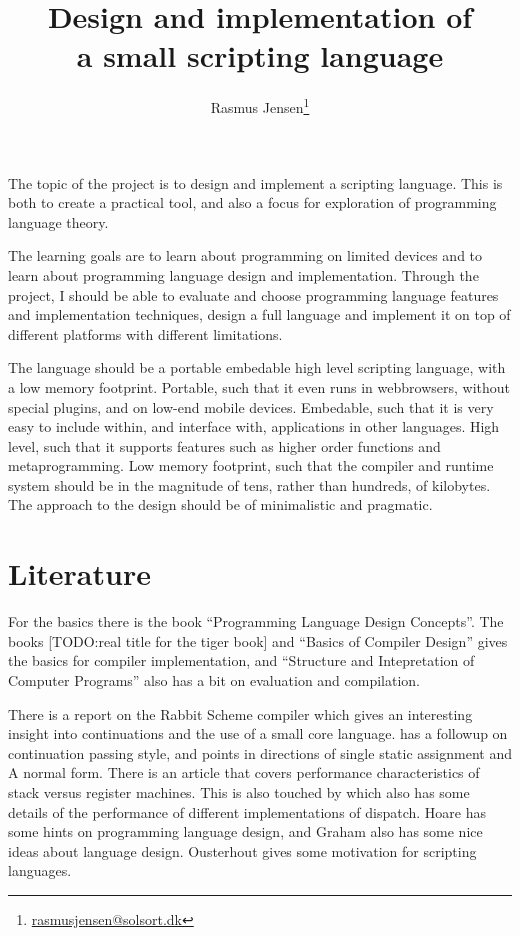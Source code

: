 \documentclass[11pt]{article}
\title{Design and implementation of \\ a small scripting language}
\author{Rasmus Jensen\footnote{\url{rasmusjensen@solsort.dk}}
}
\begin{document}
\maketitle



The topic of the project is to design and implement a scripting language.
This is both to create a practical tool, 
and also a focus for exploration of programming language theory.

The learning goals are to learn about programming on limited devices and to learn about programming language design and implementation. 
Through the project, I should be able to evaluate and choose programming language features and implementation techniques, design a full language and implement it on top of different platforms with different limitations.

The language should be a portable embedable high level scripting language, with a low memory footprint. 
Portable, such that it even runs in webbrowsers, without special plugins, and on low-end mobile devices. 
Embedable, such that it is very easy to include within, and interface with, applications in other languages.
High level, such that it supports features such as higher order functions and metaprogramming.
Low memory footprint, such that the compiler and runtime system should be in the magnitude of tens, rather than hundreds, of kilobytes.
The approach to the design should be of minimalistic and pragmatic.

\section{Literature}

For the basics there is the book ``Programming Language Design Concepts''\cite{programming-language-design-concepts}. 
The books [TODO:real title for the tiger book]\cite{tigerbook} 
and ``Basics of Compiler Design''\cite{basics-of-compiler-design} gives the basics for compiler implementation, and 
``Structure and Intepretation of Computer Programs''\cite{sicp} also has a bit on evaluation and compilation.

There is a report on the Rabbit\cite{rabbit} Scheme compiler which gives an interesting insight into continuations and the use of a small core language.
  \cite{essence-cps} has a followup on continuation passing style, and points in directions of single static assignment and A normal form.
There is an article\cite{stack-vs-register} that covers performance characteristics of stack versus register machines. 
This is also touched by \cite{case-for-vm} which also has some details of the performance of different implementations of dispatch.
Hoare\cite{hoare-hints} has some hints on programming language design, 
and Graham\cite{graham-five-questions} also has some nice ideas about language design. 
Ousterhout\cite{ousterhout-scripting} gives some motivation for scripting languages.
\end{document}

